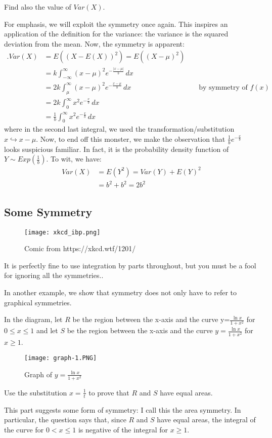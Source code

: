 \documentclass[../main.tex]{subfiles}
\begin{document}
\begin{example}[cont..]
Find also the value of $Var(X).$
\end{example}
For emphasis, we will exploit the symmetry once again. This inspires an application of the definition for the variance: the variance is the squared deviation from the mean. Now, the symmetry is apparent:
\begin{align*}.
    Var(X)&=E((X-E(X))^2)=E((X-\mu)^2) \\
    &=k\int_{-\infty}^{\infty}(x-\mu)^2e^{-\frac{|x-\mu|}{b}} \,dx\\
    &=2k\int_{\mu}^{\infty}(x-\mu)^2e^{-\frac{x-\mu}{b}} \,dx &&\text{ by symmetry of $f(x)$} \\
    &=2k\int_{0}^{\infty}x^2e^{-\frac{x}{b}} \,dx\\
    &=\frac{1}{b}\int_{0}^{\infty}x^2e^{-\frac{x}{b}} \,dx
\end{align*}
where in the second last integral, we used the transformation/substitution $x\hookrightarrow x-\mu$.
Now, to end off this monster, we make the observation that $\frac{1}{b}e^{-\frac{x}{b}}$ looks suspicious familiar. In fact, it is the probability density function of $Y \sim Exp(\frac{1}{b})$. To wit, we have:
\begin{align*}
    Var(X)&=E(Y^2)=Var(Y)+E(Y)^2\\
    &=b^2+b^2=2b^2
\end{align*}
\subsection{Some Symmetry}
\begin{figure}[H]
    \centering
    \texttt{[image: xkcd\_ibp.png]}
    \caption{Comic from https://xkcd.wtf/1201/}
\end{figure}
\begin{moral}
It is perfectly fine to use integration by parts throughout, but you must be a fool for ignoring all the symmetries..
\end{moral}

In another example, we show that symmetry does not only have to refer to graphical symmetries.

\begin{example}[2021 H3 Math P1/1]
In the diagram, let $R$ be the region between the x-axis and the curve y=$\frac{\ln{x}}{1+x^2}$ for $0\leq x \leq 1$ and let $S$ be the region between the x-axis and the curve $y=\frac{\ln {x}}{1+x^2}$ for $x\geq 1$.
 \begin{figure}[H]
    \centering
    \texttt{[image: graph-1.PNG]}
    \caption{Graph of $y=\frac{\ln{x}}{1+x^2}$}
    \label{fig:1}
\end{figure}
Use the substitution $x=\frac{1}{t}$ to prove that $R$ and $S$ have equal areas.
\end{example}
This part suggests some form of symmetry: I call this the area symmetry. In particular, the question says that, since $R$ and $S$ have equal areas, the integral of the curve for $0 < x \leq 1$ is negative of the integral for $x \geq 1$.
\end{document}
